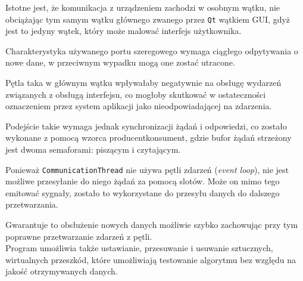 Istotne jest, że komunikacja z urządzeniem zachodzi w osobnym wątku, nie obciążając tym samym wątku głównego zwanego przez \texttt{Qt} wątkiem GUI, gdyż jest to jedyny wątek, który może malować interfejs użytkownika.

Charakterystyka używanego portu szeregowego wymaga ciągłego odpytywania o nowe dane, w przeciwnym wypadku mogą one zostać utracone.

Pętla taka w głównym wątku wpływałaby negatywnie na obsługę wydarzeń związanych z obsługą interfejsu, co mogłoby skutkować w ostateczności oznaczeniem przez system aplikacji jako nieodpowiadającej na zdarzenia.

Podejście takie wymaga jednak synchronizacji żądań i odpowiedzi, co zostało wykonane z pomocą wzorca producent\pauza{}konsument, gdzie bufor żądań strzeżony jest dwoma semaforami: piszącym i czytającym.

Ponieważ \verb|CommunicationThread| nie używa pętli zdarzeń (\textsl{event loop}), nie jest możliwe przesyłanie do niego żądań za pomocą slotów. Może on mimo tego emitować sygnały, zostało to wykorzystane do przesyłu danych do dalszego przetwarzania.

Gwarantuje to obsłużenie nowych danych możliwie szybko zachowując przy tym poprawne przetwarzanie zdarzeń z pętli.\\

Program umożliwia także ustawianie, przesuwanie i usuwanie sztucznych, wirtualnych przeszkód, które umożliwiają testowanie algorytmu bez względu na jakość otrzymywanych danych.

